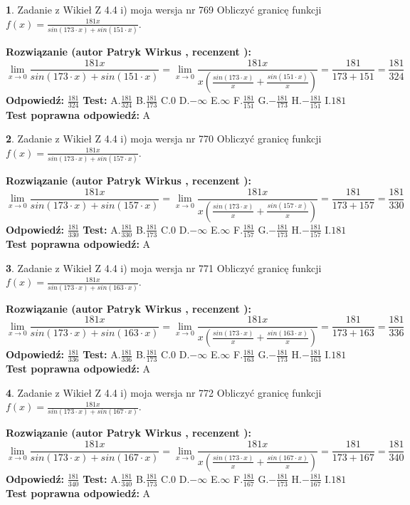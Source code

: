 \documentclass[12pt, a4paper]{article}
\theoremstyle{definition} %
\newtheorem{zad}{}
\newcommand{\zadStart}[1]{\begin{zad}#1\newline}
\newcommand{\zadStop}{\end{zad}}
\newcommand{\rozwStart}[2]{\noindent \textbf{Rozwiązanie (autor #1 , recenzent #2): }\newline}
\newcommand{\rozwStop}{\newline}
\newcommand{\odpStart}{\noindent \textbf{Odpowiedź:}\newline}
\newcommand{\odpStop}{\newline}
\newcommand{\testStart}{\noindent \textbf{Test:}\newline}
\newcommand{\testStop}{\newline}
\newcommand{\kluczStart}{\noindent \textbf{Test poprawna odpowiedź:}\newline}
\newcommand{\kluczStop}{\newline}
\begin{document}
\zadStart{Zadanie z Wikieł Z 4.4 i) moja wersja nr 769}
Obliczyć granicę funkcji $f(x)=\frac{181x}{sin(173\cdot x) +sin(151\cdot x)}$.
\zadStop
\rozwStart{Patryk Wirkus}{}
$$\lim\limits_{x\to 0}\frac{181x}{sin(173\cdot x) +sin(151\cdot x)}=\lim\limits_{x\to 0}\frac{181x}{x(\frac{sin(173\cdot x)}{x}+\frac{sin(151\cdot x)}{x})}=\frac{181}{173+151} = \frac{181}{324}$$
\rozwStop
\odpStart
$\frac{181}{324}$
\odpStop
\testStart
A.$\frac{181}{324}$
B.$\frac{181}{173}$
C.$0$
D.$-\infty$
E.$\infty$
F.$\frac{181}{151}$
G.$-\frac{181}{173}$
H.$-\frac{181}{151}$
I.$181$
\testStop
\kluczStart
A
\kluczStop



\zadStart{Zadanie z Wikieł Z 4.4 i) moja wersja nr 770}
Obliczyć granicę funkcji $f(x)=\frac{181x}{sin(173\cdot x) +sin(157\cdot x)}$.
\zadStop
\rozwStart{Patryk Wirkus}{}
$$\lim\limits_{x\to 0}\frac{181x}{sin(173\cdot x) +sin(157\cdot x)}=\lim\limits_{x\to 0}\frac{181x}{x(\frac{sin(173\cdot x)}{x}+\frac{sin(157\cdot x)}{x})}=\frac{181}{173+157} = \frac{181}{330}$$
\rozwStop
\odpStart
$\frac{181}{330}$
\odpStop
\testStart
A.$\frac{181}{330}$
B.$\frac{181}{173}$
C.$0$
D.$-\infty$
E.$\infty$
F.$\frac{181}{157}$
G.$-\frac{181}{173}$
H.$-\frac{181}{157}$
I.$181$
\testStop
\kluczStart
A
\kluczStop



\zadStart{Zadanie z Wikieł Z 4.4 i) moja wersja nr 771}
Obliczyć granicę funkcji $f(x)=\frac{181x}{sin(173\cdot x) +sin(163\cdot x)}$.
\zadStop
\rozwStart{Patryk Wirkus}{}
$$\lim\limits_{x\to 0}\frac{181x}{sin(173\cdot x) +sin(163\cdot x)}=\lim\limits_{x\to 0}\frac{181x}{x(\frac{sin(173\cdot x)}{x}+\frac{sin(163\cdot x)}{x})}=\frac{181}{173+163} = \frac{181}{336}$$
\rozwStop
\odpStart
$\frac{181}{336}$
\odpStop
\testStart
A.$\frac{181}{336}$
B.$\frac{181}{173}$
C.$0$
D.$-\infty$
E.$\infty$
F.$\frac{181}{163}$
G.$-\frac{181}{173}$
H.$-\frac{181}{163}$
I.$181$
\testStop
\kluczStart
A
\kluczStop



\zadStart{Zadanie z Wikieł Z 4.4 i) moja wersja nr 772}
Obliczyć granicę funkcji $f(x)=\frac{181x}{sin(173\cdot x) +sin(167\cdot x)}$.
\zadStop
\rozwStart{Patryk Wirkus}{}
$$\lim\limits_{x\to 0}\frac{181x}{sin(173\cdot x) +sin(167\cdot x)}=\lim\limits_{x\to 0}\frac{181x}{x(\frac{sin(173\cdot x)}{x}+\frac{sin(167\cdot x)}{x})}=\frac{181}{173+167} = \frac{181}{340}$$
\rozwStop
\odpStart
$\frac{181}{340}$
\odpStop
\testStart
A.$\frac{181}{340}$
B.$\frac{181}{173}$
C.$0$
D.$-\infty$
E.$\infty$
F.$\frac{181}{167}$
G.$-\frac{181}{173}$
H.$-\frac{181}{167}$
I.$181$
\testStop
\kluczStart
A
\kluczStop
\end{document}
